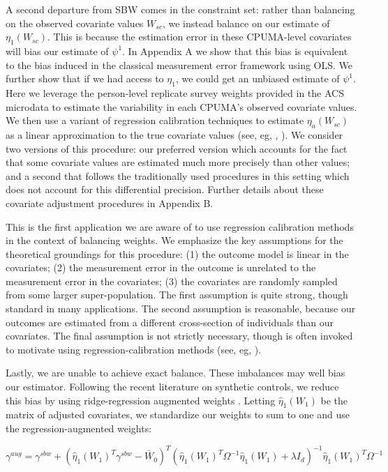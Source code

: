 \documentclass[12pt]{article}
\begin{document}
A second departure from SBW comes in the constraint set: rather than balancing on the observed covariate values $W_{sc}$, we instead balance on our estimate of $\eta_1(W_{sc})$. This is because the estimation error in these CPUMA-level covariates will bias our estimate of $\psi^1$. In Appendix A we show that this bias is equivalent to the bias induced in the classical measurement error framework using OLS. We further show that if we had access to $\eta_1$, we could get an unbiased estimate of $\psi^1$. Here we leverage the person-level replicate survey weights provided in the ACS microdata to estimate the variability in each CPUMA's observed covariate values. We then use a variant of regression calibration techniques to estimate $\eta_a(W_{sc})$ as a linear approximation to the true covariate values (see, eg, \cite{gleser1992importance}, \cite{carroll2006measurement}). We consider two versions of this procedure: our preferred version which accounts for the fact that some covariate values are estimated much more precisely than other values; and a second that follows the traditionally used procedures in this setting which does not account for this differential precision. Further details about these covariate adjustment procedures in Appendix B.

This is the first application we are aware of to use regression calibration methods in the context of balancing weights. We emphasize the key assumptions for the theoretical groundings for this procedure: (1) the outcome model is linear in the covariates; (2) the measurement error in the outcome is unrelated to the measurement error in the covariates; (3) the covariates are randomly sampled from some larger super-population. The first assumption is quite strong, though standard in many applications. The second assumption is reasonable, because our outcomes are estimated from a different cross-section of individuals than our covariates. The final assumption is not strictly necessary, though is often invoked to motivate using regression-calibration methods (see, eg, \cite{gleser1992importance}). 

Lastly, we are unable to achieve exact balance. These imbalances may well bias our estimator. Following the recent literature on synthetic controls, we reduce this bias by using ridge-regression augmented weights \cite{ben2018augmented}. Letting $\hat{\eta}_1(W_1)$ be the matrix of adjusted covariates, we standardize our weights to sum to one and use the regression-augmented weights:

$$
\gamma^{aug} = \gamma^{sbw} + (\hat{\eta}_1(W_1)^T\gamma^{sbw} - \bar{W}_0)^T(\hat{\eta}_1(W_1)^T\Omega^{-1}\hat{\eta}_1(W_1) + \lambda I_d)^{-1}\hat{\eta}_1(W_1)^T\Omega^{-1}
$$
\end{document}
